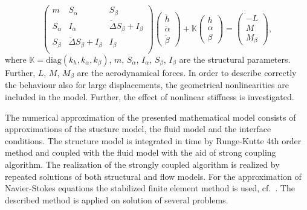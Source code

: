 \begin{equation}
  \label{eq:ODE3}
 \left(
 \begin{array}{ccc}
   m         &     S_\alpha                           &    S_\beta                    \\
   S_\alpha  &     I_\alpha                           &    \widetilde{\Delta} S_\beta  + I_\beta \\
   S_\beta   &  \widetilde{\Delta} S_\beta  + I_\beta       &    I_\beta                    \\
 \end{array}
 \right)
 \left( \begin{array}{c} \ddot{h} \\ \ddot{\alpha} \\ \ddot{\beta} \end{array} \right)
+ {\mathbb K}
 \left( \begin{array}{c} h \\ \alpha \\ \beta\end{array} \right)
 = 
 \left( \begin{array}{c} -L  \\ M \\ M_\beta\end{array} \right),
\end{equation}
where ${\mathbb K}=\mbox{diag}( k_{h},k_{\alpha},k_{\beta})$, $m$, $S_\alpha$, $I_\alpha$, $S_\beta$,
$I_\beta$ are the structural parameters. Further, $L$, $M$, $M_\beta$ are the aerodynamical forces.
In order to describe correctly the behaviour also for large displacements, the geometrical nonlinearities 
are included in the model. Further, the effect of nonlinear stiffness is investigated.

The numerical approximation of the presented mathematical model consists of approximations of the stucture model,
the fluid model and the interface conditions. The structure model is integrated in time by Runge-Kutte 4th order method and coupled with 
the fluid model with the aid of strong coupling algorithm. The realization of the strongly coupled algorithm
is realized by repeated solutions of both structural and flow models. 
For the approximation of Navier-Stokes equations the stabilized finite element method is used, cf.~\cite{Sva1}.
The described method is applied on solution of several problems.

